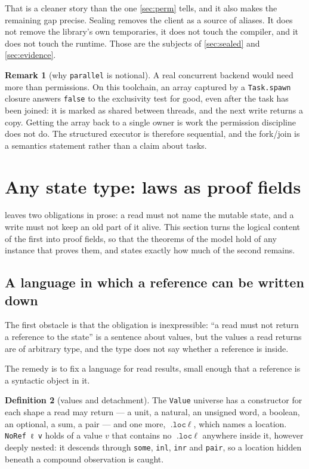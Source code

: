 \documentclass[11pt,a4paper]{article}
\theoremstyle{definition}
\newtheorem{definition}{Definition}[section]
\newtheorem{remark}[definition]{Remark}
\theoremstyle{plain}
\newcommand{\code}[1]{\texttt{#1}}
\begin{document}
That is a cleaner story than the one \cref{sec:perm} tells, and it also makes the
remaining gap precise. Sealing removes the client as a source of aliases. It does
not remove the library's own temporaries, it does not touch the compiler, and it
does not touch the runtime. Those are the subjects of \cref{sec:sealed} and
\cref{sec:evidence}.

\begin{remark}[why \code{parallel} is notional]\label{rem:parallel}
A real concurrent backend would need more than permissions. On this toolchain,
an array captured by a \code{Task.spawn} closure answers \code{false} to the
exclusivity test for good, even after the task has been joined: it is marked as
shared between threads, and the next write returns a copy. Getting the array
back to a single owner is work the permission discipline does not do. The
structured executor is therefore sequential, and the fork/join is a semantics
statement rather than a claim about tasks.
\end{remark}

\section{Any state type: laws as proof fields}\label{sec:lawful}

 leaves two obligations in prose: a read must not name the
mutable state, and a write must not keep an old part of it alive. This section
turns the logical content of the first into proof fields, so that the theorems
of the model hold of any instance that proves them, and states exactly how much
of the second remains.

\subsection{A language in which a reference can be written down}

The first obstacle is that the obligation is inexpressible: ``a read must not
return a reference to the state'' is a sentence about values, but the values a
read returns are of arbitrary type, and the type does not say whether a
reference is inside.

The remedy is to fix a language for read results, small enough that a reference
is a syntactic object in it.

\begin{definition}[values and detachment]\label{def:value}
The \code{Value} universe has a constructor for each shape a read may return ---
a unit, a natural, an unsigned word, a boolean, an optional, a sum, a pair ---
and one more, $\code{.loc}\ \ell$, which names a location. \code{NoRef ℓ v}
holds of a value $v$ that contains no $\code{.loc}\ \ell$ anywhere inside it,
however deeply nested: it descends through \code{some}, \code{inl}, \code{inr}
and \code{pair}, so a location hidden beneath a compound observation is caught.
\end{definition}
\end{document}
